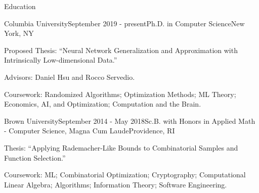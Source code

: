 \documentclass{resume} %
\begin{document}

\begin{rSection}{Education}
\begin{rSubsection}{Columbia University}{September 2019 - present}{Ph.D. in Computer Science}{New York, NY}
\item Proposed Thesis: ``Neural Network Generalization and Approximation with Intrinsically Low-dimensional Data.''
\item Advisors: Daniel Hsu and Rocco Servedio.
\item Coursework: Randomized Algorithms; Optimization Methods; ML Theory; Economics, AI, and Optimization; Computation and the Brain.
\end{rSubsection}

\begin{rSubsection}{Brown University}{September 2014 - May 2018}{Sc.B. with Honors in Applied Math - Computer Science, Magna Cum Laude}{Providence, RI}
\item Thesis: ``Applying Rademacher-Like Bounds to Combinatorial Samples and Function Selection.''
\item Coursework: ML; Combinatorial Optimization; Cryptography; Computational Linear Algebra; Algorithms; Information Theory; Software Engineering.
\end{rSubsection}


\end{rSection}




\end{document}
